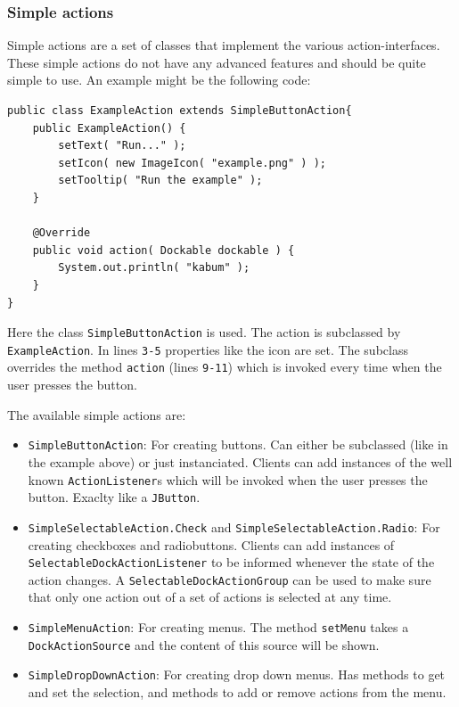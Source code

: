 \documentclass[a4paper,10pt]{article}
\newcommand{\src}[1]{\texttt{#1}}
\begin{document}
\subsubsection{Simple actions}
Simple actions are a set of classes that implement the various action-interfaces. These simple actions do not have any advanced features and should be quite simple to use. An example might be the following code:

\begin{lstlisting}
public class ExampleAction extends SimpleButtonAction{
	public ExampleAction() {
		setText( "Run..." );
		setIcon( new ImageIcon( "example.png" ) );
		setTooltip( "Run the example" );
	}

	@Override
	public void action( Dockable dockable ) {
		System.out.println( "kabum" );
	}
}
\end{lstlisting}

Here the class \src{SimpleButtonAction} is used. The action is subclassed by \src{ExampleAction}. In lines \src{3-5} properties like the icon are set. The subclass overrides the method \src{action} (lines \src{9-11}) which is invoked every time when the user presses the button.

The available simple actions are:
\begin{itemize}
	\item \src{SimpleButtonAction}: For creating buttons. Can either be subclassed (like in the example above) or just instanciated. Clients can add instances of the well known \src{ActionListener}s which will be invoked when the user presses the button. Exaclty like a \src{JButton}.
	\item \src{SimpleSelectableAction.Check} and \src{SimpleSelectableAction.Radio}: \linebreak For creating checkboxes and radiobuttons. Clients can add instances of \linebreak \src{SelectableDockActionListener} to be informed whenever the state of the action changes. A \src{SelectableDockActionGroup} can be used to make sure that only one action out of a set of actions is selected at any time.
	\item \src{SimpleMenuAction}: For creating menus. The method \src{setMenu} takes a \src{DockActionSource} and the content of this source will be shown.
	\item \src{SimpleDropDownAction}: For creating drop down menus. Has methods to get and set the selection, and methods to add or remove actions from the menu.
\end{itemize}
\end{document}
